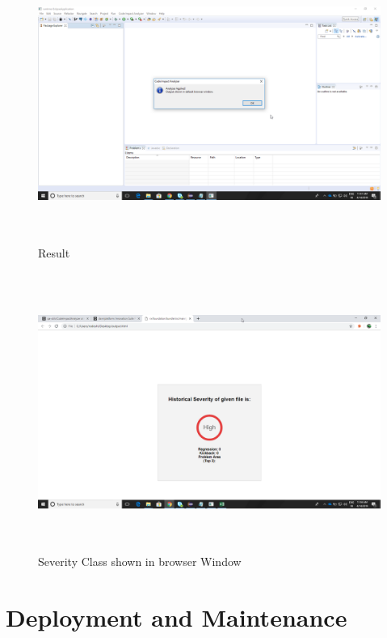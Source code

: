 \documentclass[oneside,a4paper,12pt]{book}
\begin{document}
\begin{figure}[H]
	\begin{Center}
		\includegraphics[width=5.75in,height=3.57in,scale=1.5]{RxAV7mor4S.png}
		\caption{Result}
		\label{fig:Result}
	\end{Center}
\end{figure}

\begin{figure}[H]
	\begin{Center}
		\includegraphics[width=5.75in,height=3.57in,scale=1.5]{chrome_sbdKh2cylo.png}
		\caption{Severity Class shown in browser Window}
		\label{fig:Output}
	\end{Center}
\end{figure}


\newpage
\chapter{Deployment and Maintenance}
\end{document}
